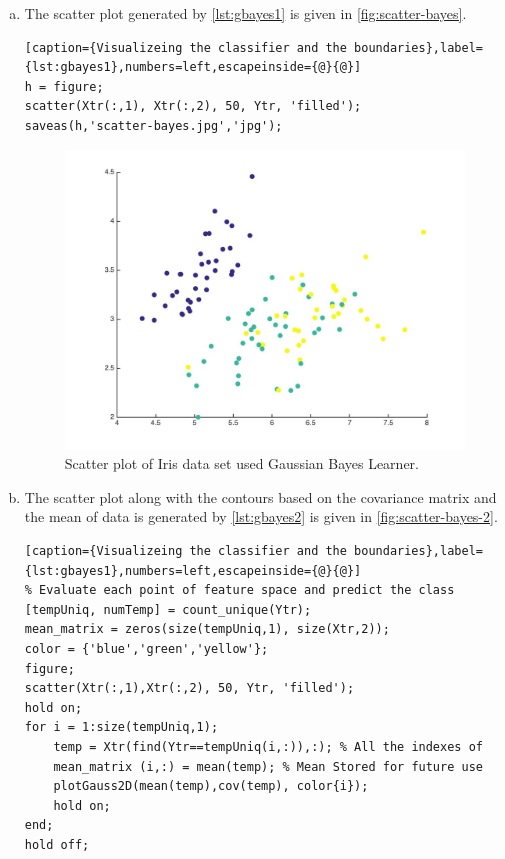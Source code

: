 \documentclass[a4paper, 11pt]{article}
\begin{document}
\begin{enumerate}[(a)]
\item The scatter plot generated by \autoref{lst:gbayes1} is given in \autoref{fig:scatter-bayes}.
\vspace{-20pt}
\begin{lstlisting}[caption={Visualizeing the classifier and the boundaries},label={lst:gbayes1},numbers=left,escapeinside={@}{@}]
h = figure;
scatter(Xtr(:,1), Xtr(:,2), 50, Ytr, 'filled');
saveas(h,'scatter-bayes.jpg','jpg');
\end{lstlisting}

\begin{figure}
\centering
\includegraphics[scale=0.25]{scatter-bayes.jpg}
\caption[Scatter]{Scatter plot of Iris data set used Gaussian Bayes Learner.}
\label{fig:scatter-bayes}
\end{figure}

\item The scatter plot along with the contours based on the covariance matrix and the mean of data is generated by \autoref{lst:gbayes2} is given in \autoref{fig:scatter-bayes-2}.
\vspace{-20pt}
\begin{lstlisting}[caption={Visualizeing the classifier and the boundaries},label={lst:gbayes1},numbers=left,escapeinside={@}{@}]
% Evaluate each point of feature space and predict the class
[tempUniq, numTemp] = count_unique(Ytr);
mean_matrix = zeros(size(tempUniq,1), size(Xtr,2));
color = {'blue','green','yellow'};
figure;
scatter(Xtr(:,1),Xtr(:,2), 50, Ytr, 'filled');
hold on;
for i = 1:size(tempUniq,1);
    temp = Xtr(find(Ytr==tempUniq(i,:)),:); % All the indexes of 
    mean_matrix (i,:) = mean(temp); % Mean Stored for future use
    plotGauss2D(mean(temp),cov(temp), color{i});
    hold on;
end;
hold off;
\end{lstlisting}


\end{enumerate}
\end{document}
